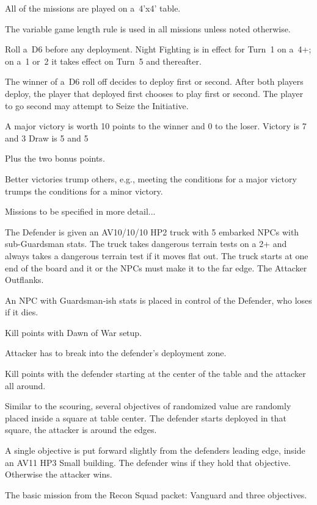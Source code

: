 All of the missions are played on a~4'x4' table.

The variable game length rule is used in all missions unless noted otherwise.

  Roll a~D6 before any
deployment.  Night Fighting is in effect for Turn~1 on a~4+; on a~1
or~2 it takes effect on Turn~5 and thereafter.

The winner of a~D6 roll off decides to deploy first or second.  After
both players deploy, the player that deployed first chooses to play
first or second.  The player to go second may attempt to Seize the
Initiative.


A major victory is worth 10 points to the winner and 0 to the loser.
Victory is 7 and 3
Draw is 5 and 5

Plus the two bonus points.

Better victories trump others, e.g., meeting the conditions for a
major victory trumps the conditions for a minor victory.

Missions to be specified in more detail...


The Defender is given an AV10/10/10 HP2 truck with 5 embarked NPCs
with sub-Guardsman stats.  The truck takes dangerous terrain tests on
a 2+ and always takes a dangerous terrain test if it moves flat out.
The truck starts at one end of the board and it or the NPCs must make
it to the far edge.  The Attacker Outflanks.



An NPC with Guardsman-ish stats is placed in control of the Defender,
who loses if it dies.



Kill points with Dawn of War setup.



Attacker has to break into the defender's deployment zone.



Kill points with the defender starting at the center of the table and
the attacker all around.



Similar to the scouring, several objectives of randomized value are
randomly placed inside a square at table center.  The defender starts
deployed in that square, the attacker is around the edges.



A single objective is put forward slightly from the defenders leading
edge, inside an AV11 HP3 Small building.  The defender wins if they
hold that objective.  Otherwise the attacker wins.



The basic mission from the Recon Squad packet: Vanguard and three objectives.
